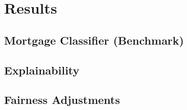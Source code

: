 \section{Results}\label{sec:Results}

\subsection{Mortgage Classifier (Benchmark)}\label{subsec:Mortgage Classifier (Benchmark) Results}

\subsection{Explainability}\label{Explainability Results}

\subsection{Fairness Adjustments}\label{Fairness Adjustments Results}